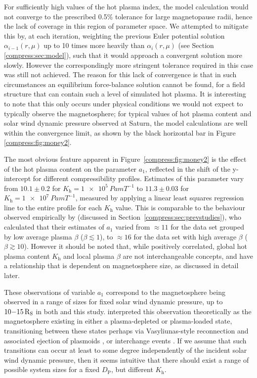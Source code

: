 For sufficiently high values of the hot plasma index, the model calculation would not converge to the prescribed 0.5$\%$ tolerance for large magnetopause radii, hence the lack of coverage in this region of parameter space. We attempted to mitigate this by, at each iteration, weighting the previous Euler potential solution $\alpha_{i-1}(r,\mu)$ up to 10 times more heavily than $\alpha_{i}(r,\mu)$ (see Section \ref{compress:sec:model}), such that it would approach a convergent solution more slowly. However the correspondingly more stringent tolerance required in this case was still not achieved. The reason for this lack of convergence is that in such circumstances an equilibrium force-balance solution cannot be found, for a field structure that can contain such a level of simulated hot plasma. It is interesting to note that this only occurs under physical conditions we would not expect to typically observe the magnetosphere; for typical values of hot plasma content and solar wind dynamic pressure observed at Saturn, the model calculations are well within the convergence limit, as shown by the black horizontal bar in Figure \ref{compress:fig:money2}.

The most obvious feature apparent in Figure~\ref{compress:fig:money2} is the effect of the hot plasma content on the parameter $a_1$, reflected in the shift of the y-intercept for different compressibility profiles. Estimates of this parameter vary from $10.1 \pm 0.2$ for $K_\mathrm{h}=\SI{1e5}{Pa m T^{-1}}$ to $11.3 \pm 0.03$ for $K_\mathrm{h}=\SI{1e7}{Pa m T^{-1}}$, measured by applying a linear least squares regression line to the entire profile for each $K_\mathrm{h}$ value. This is comparable to the behaviour observed empirically by \citet{pilkington2015} (discussed in Section~\ref{compress:sec:prevstudies}), who calculated that their estimates of $a_1$ varied from $\approx 11$ for the data set grouped by low average plasma $\beta$ ($\beta\lesssim 1$), to $\approx 16$ for the data set with high average $\beta$ ($\beta\gtrsim 10$). However it should be noted that, while positively correlated, global hot plasma content $K_\mathrm{h}$ and local plasma $\beta$ are not interchangeable concepts, and have a relationship that is dependent on magnetosphere size, as discussed in detail later. 

These observations of variable $a_1$ correspond to the magnetosphere being observed in a range of sizes for fixed solar wind dynamic pressure, up to $10{\--}\SI{15}{R_S}$ in both \citet{pilkington2015} and this study. \citet{pilkington2015} interpreted this observation theoretically as the magnetosphere existing in either a plasma-depleted or plasma-loaded state, transitioning between these states perhaps via Vasyliunas-style reconnection and associated ejection of plasmoids \citep{vasyliunas1983}, or interchange events \citep{mitchell2015}. If we assume that such transitions can occur at least to some degree independently of the incident solar wind dynamic pressure, then it seems intuitive that there should exist a range of possible system sizes for a fixed $D_\mathrm{P}$, but different $K_\mathrm{h}$. 

